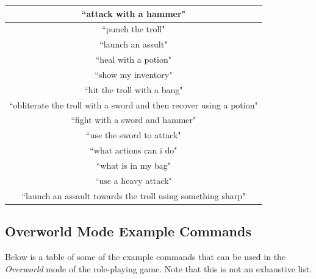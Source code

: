 \documentclass[11pt]{article}
\begin{document}
\begin{appendices}
\begin{table}[H]
\centering
\begin{tabular}{|c|}
\hline
``attack with a hammer"                    \\ \hline
``punch the troll"   \\ \hline
``launch an assult"           \\ \hline
``heal with a potion"  \\ \hline
``show my inventory"      \\ \hline
``hit the troll with a bang"        \\ \hline
``obliterate the troll with a sword and then recover using a potion" \\ \hline
``fight with a sword and hammer"                      \\ \hline
``use the sword to attack"            \\ \hline
``what actions can i do"                \\ \hline
``what is in my bag"                    \\ \hline
``use a heavy attack"              \\ \hline
``launch an assault towards the troll using something sharp"             \\ \hline
\end{tabular}
\end{table}

\newpage
\subsection{Overworld Mode Example Commands}
\label{appendix:overworld-examples}

Below is a table of some of the example commands that can be used in the \textit{Overworld} mode of the role-playing game. Note that this is not an exhaustive list.


\end{appendices}
\end{document}

